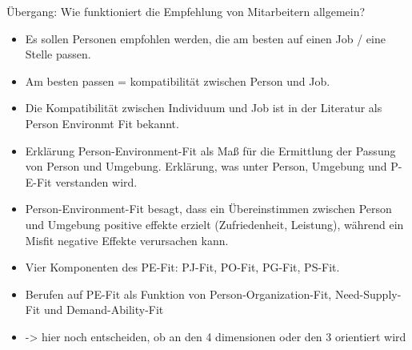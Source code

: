 Übergang: Wie funktioniert die Empfehlung von Mitarbeitern allgemein?
\begin{itemize}
    \item Es sollen Personen empfohlen werden, die am besten auf einen Job / eine Stelle passen.
    \item Am besten passen = kompatibilität zwischen Person und Job. %
    \item Die Kompatibilität zwischen Individuum und Job ist in der Literatur als Person Environmt Fit bekannt. %
    \item Erklärung Person-Environment-Fit als Maß für die Ermittlung der Passung von Person und Umgebung. Erklärung, was unter Person, Umgebung und P-E-Fit verstanden wird.
    \item Person-Environment-Fit besagt, dass ein Übereinstimmen zwischen Person und Umgebung positive effekte erzielt (Zufriedenheit, Leistung), während ein Misfit negative Effekte verursachen kann. %
    \item Vier Komponenten des PE-Fit: PJ-Fit, PO-Fit, PG-Fit, PS-Fit. %
    \item Berufen auf PE-Fit als Funktion von Person-Organization-Fit, Need-Supply-Fit und Demand-Ability-Fit %
    \item -> hier noch entscheiden, ob an den 4 dimensionen oder den 3 orientiert wird
\end{itemize}

